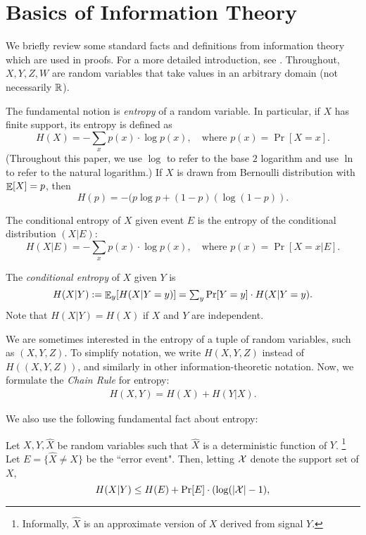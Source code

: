 \section{Basics of Information Theory}
\label{app:info-theory}

We briefly review some standard facts and definitions from information theory which are used in proofs. For a more detailed introduction, see \cite{CK11}. Throughout, $X,Y,Z,W$ are random variables that take values in an arbitrary domain (not necessarily $\mathbb{R}$).

The fundamental notion is \emph{entropy} of a random variable. In particular, if $X$ has finite support, its entropy is defined as
\[ H(X) = \textstyle - \sum_{x} p(x)\cdot  \log p(x),
\quad\text{where } p(x) = \Pr[X = x]. \]
(Throughout this paper, we use $\log$ to refer to the base $2$ logarithm and use $\ln$ to refer to the natural logarithm.) If $X$ is drawn from Bernoulli distribution with $\mathop{\mathbb{E}}[X]=p$, then
    \[ H(p) = -(p\log p + (1-p)(\log(1-p)). \]

The conditional entropy of $X$ given event $E$ is the entropy of the conditional distribution $(X|E)$:
\[ H(X|E) = \textstyle - \sum_{x} p(x)\cdot  \log p(x),
\quad\text{where } p(x) = \Pr[X = x | E]. \]

The \emph{conditional entropy} of $X$ given $Y$ is
\[ H(X|Y)
    := \textstyle \mathop{\mathbb{E}}_y[H(X|Y = y)]
    = \textstyle \sum_{y} \Pr[Y=y]\cdot H(X|Y = y). \]
Note that $H(X|Y) = H(X)$ if $X$ and $Y$ are independent.

We are sometimes interested in the entropy of a tuple of random variables, such as $(X,Y,Z)$. To simplify notation, we write $H(X,Y,Z)$ instead of $H((X,Y,Z))$, and similarly in other information-theoretic notation. Now, we formulate the \emph{Chain Rule} for entropy:
\begin{align}\label{app:info-entropy-chain-rule}
 H(X,Y) = H(X) + H(Y|X).
\end{align}


We also use the following fundamental fact about entropy:

\begin{lemma}
Let $X,Y,\hat{X}$ be random variables such that $\hat{X}$ is a deterministic function of $Y$.%
\footnote{Informally, $\hat{X}$ is an approximate version of $X$ derived from signal $Y$.} Let $E = \{ \hat{X} \neq X \}$ be the ``error event". Then, letting
$\mathcal{X}$ denote the support set of $X$,
    \[ H(X|Y) \leq H(E) + \Pr[E] \cdot (\log(|\mathcal{X}|-1), \]
\end{lemma}

